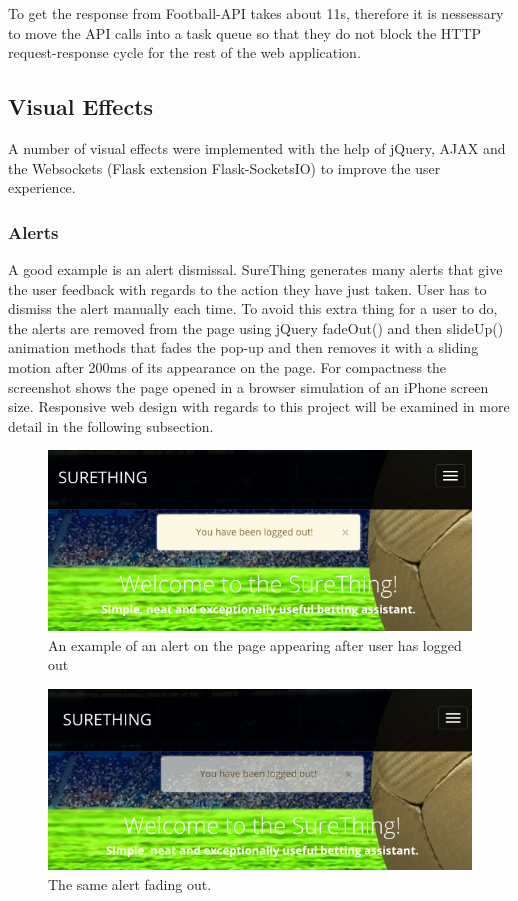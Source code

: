To get the response from Football-API takes about 11s, therefore it is nessessary to move the API calls into a task queue so that they do not block the HTTP request-response cycle for the rest of the web application.

\subsection{Visual Effects}
A number of visual effects were implemented with the help of jQuery, AJAX and the Websockets (Flask extension Flask-SocketsIO) to improve the user experience.

\subsubsection*{Alerts}
A good example is an alert dismissal. SureThing generates many alerts that give the user feedback with regards to the action they have just taken. User has to dismiss the alert manually each time. To avoid this extra thing for a user to do, the alerts are removed from the page using jQuery fadeOut() and then slideUp() animation methods that fades the pop-up and then removes it with a sliding motion after 200ms of its appearance on the page. For compactness the screenshot shows the page opened in a browser simulation of an iPhone screen size. Responsive web design with regards to this project will be examined in more detail in the following subsection.

\begin{figure}[H]
	\begin{center}
		\includegraphics[width=.60\textwidth]{impl/images/alert}
		\caption{An example of an alert on the page appearing after user has logged out} \label{fig:alert}
	\end{center}
\end{figure}

\begin{figure}[H]
	\begin{center}
		\includegraphics[width=.60\textwidth]{impl/images/alertFadeOut}
		\caption{The same alert fading out.} \label{fig:alertFadeOut}
	\end{center}
\end{figure}

